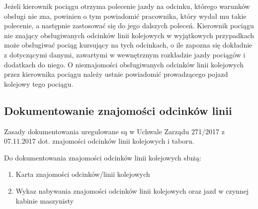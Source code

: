 Jeżeli kierownik pociągu otrzyma polecenie jazdy na odcinku, którego warunków obsługi nie zna, powinien o tym powiadomić pracownika, który wydał mu takie polecenie, a następnie zastosować się do jego dalszych poleceń. Kierownik pociągu nie znający obsługiwanych odcinków linii kolejowych w wyjątkowych przypadkach może obsługiwać pociąg kursujący na tych odcinkach, o ile zapozna się dokładnie z dotyczącymi danymi, zawartymi w wewnętrznym rozkładzie jazdy pociągów i dodatkach do niego. O nieznajomości obsługiwanych odcinków linii kolejowych przez kierownika pociągu należy ustnie powiadomić prowadzącego pojazd kolejowy tego pociągu.

\subsection{Dokumentowanie znajomości odcinków linii}

Zasady dokumentowania uregulowane są w Uchwale Zarządu 271/2017 z 07.11.2017 dot. znajomości odcinków linii kolejowych i taboru.

Do dokumentowania znajomości odcinków linii kolejowych służą:
\begin{enumerate}
	\item Karta znajomości odcinków/linii kolejowych
	\item Wykaz nabywania znajomości odcinków linii kolejowych oraz jazd w czynnej kabinie maszynisty
\end{enumerate}


